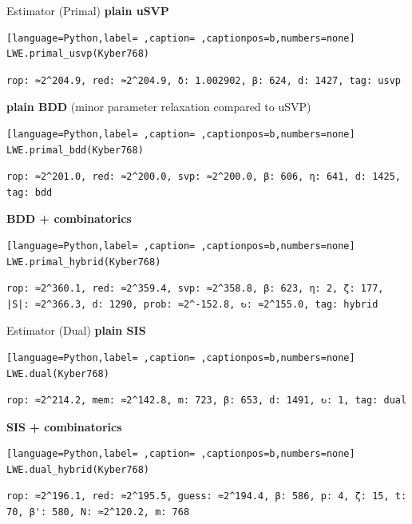 \documentclass[table,10pt,aspectratio=169]{beamer}
\begin{document}
\begin{frame}[label={sec:org3cd47e9},fragile]{Estimator (Primal)}
 \textbf{plain uSVP}

\begin{lstlisting}[language=Python,label= ,caption= ,captionpos=b,numbers=none]
LWE.primal_usvp(Kyber768)
\end{lstlisting}

\begin{verbatim}
rop: ≈2^204.9, red: ≈2^204.9, δ: 1.002902, β: 624, d: 1427, tag: usvp
\end{verbatim}


\textbf{plain BDD} (minor parameter relaxation compared to uSVP)

\begin{lstlisting}[language=Python,label= ,caption= ,captionpos=b,numbers=none]
LWE.primal_bdd(Kyber768)
\end{lstlisting}

\begin{verbatim}
rop: ≈2^201.0, red: ≈2^200.0, svp: ≈2^200.0, β: 606, η: 641, d: 1425, tag: bdd
\end{verbatim}


\textbf{BDD + combinatorics}

\begin{lstlisting}[language=Python,label= ,caption= ,captionpos=b,numbers=none]
LWE.primal_hybrid(Kyber768)
\end{lstlisting}

\begin{verbatim}
rop: ≈2^360.1, red: ≈2^359.4, svp: ≈2^358.8, β: 623, η: 2, ζ: 177, |S|: ≈2^366.3, d: 1290, prob: ≈2^-152.8, ↻: ≈2^155.0, tag: hybrid
\end{verbatim}
\end{frame}

\begin{frame}[label={sec:orgc754852},fragile]{Estimator (Dual)}
 \textbf{plain SIS}

\begin{lstlisting}[language=Python,label= ,caption= ,captionpos=b,numbers=none]
LWE.dual(Kyber768)
\end{lstlisting}

\begin{verbatim}
rop: ≈2^214.2, mem: ≈2^142.8, m: 723, β: 653, d: 1491, ↻: 1, tag: dual
\end{verbatim}


\textbf{SIS + combinatorics}

\begin{lstlisting}[language=Python,label= ,caption= ,captionpos=b,numbers=none]
LWE.dual_hybrid(Kyber768)
\end{lstlisting}

\begin{verbatim}
rop: ≈2^196.1, red: ≈2^195.5, guess: ≈2^194.4, β: 586, p: 4, ζ: 15, t: 70, β': 580, N: ≈2^120.2, m: 768
\end{verbatim}
\end{frame}
\end{document}
